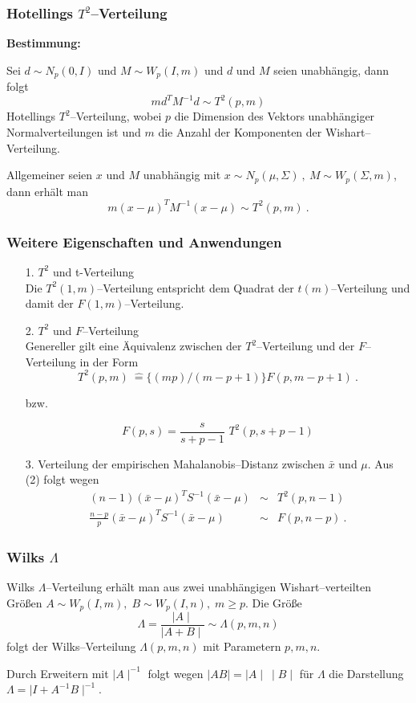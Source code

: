\begin{frame}\frametitle{Hotellings $T^2$--Verteilung}
{\bf Bestimmung:}

Sei $d \sim N_p(0,I)$ und $M \sim W_p(I,m)$ und $d$ und $M$ seien
unabh\"{a}ngig, dann folgt
\[
m d^T M^{-1}d \sim T^2(p,m)
\]
Hotellings $T^2$--Verteilung, wobei $p$ die Dimension des Vektors
unabh\"{a}ngiger Normalverteilungen ist und $m$ die Anzahl der
Komponenten der Wishart--Verteilung.

Allgemeiner seien $x$ und $M$ unabh\"{a}ngig mit $x \sim
N_p(\mu,\Sigma)\ ,\ M \sim W_p(\Sigma, m)$, dann erh\"{a}lt man
\[
m(x-\mu)^TM^{-1}(x - \mu) \sim T^2(p,m)\ .
\]
\end{frame}


\begin{frame}\frametitle{Weitere Eigenschaften und Anwendungen}
\footnotesize
\begin{enumerate}
\item [1.] $T^2$ und t-Verteilung\\
Die $T^2(1,m)$--Verteilung entspricht dem Quadrat der
$t(m)$--Verteilung und damit der $F(1,m)$--Verteilung.

\item [2.] $T^2$ und $F$--Verteilung\\
Genereller gilt eine \"{A}quivalenz zwischen der $T^2$--Verteilung
und der $F$--Verteilung in der Form
\[
T^2(p,m)\ {\hat=}\{(mp)/(m-p+1)\} F(p, m-p + 1)\ .
\]

bzw.

\[F(p,s)=\frac{s}{s+p-1}\,\,T^2(p,s+p-1)\]

\item [3.] Verteilung der empirischen Mahalanobis--Distanz zwischen $\bar{x}$
und $\mu$. Aus (2) folgt wegen
\begin{eqnarray*}%
  (n-1) (\bar{x} - \mu)^T S^{-1} (\bar{x}-\mu) & \sim & T^2(p,n-1) \\
  \frac{n-p}{p}(\bar{x}-\mu)^T S^{-1} (\bar{x} - \mu) & \sim & F(p, n-p)\ .
\end{eqnarray*}

\end{enumerate}
\end{frame}


\begin{frame}\frametitle{Wilks $\Lambda$}
Wilks $\Lambda$--Verteilung erh\"{a}lt man aus zwei unabh\"{a}ngigen
Wishart--verteilten Gr\"{o}{\ss}en $A\sim W_p(I, m),\;B\sim W_p(I,
n),\;m\ge p$. Die Gr\"{o}{\ss}e
\[
\Lambda=\frac{\mid A\mid}{\mid A + B\mid} \sim \Lambda(p, m, n)
\]
folgt der Wilks--Verteilung $\Lambda(p, m, n)$ mit Parametern $p, m,
n$.

Durch Erweitern mit  $\mid A\mid^{-1}$ folgt wegen $\mid A B\mid=
\mid A\mid\ \mid B\mid$ f\"{u}r $\Lambda$ die Darstellung
$\Lambda=\mid I + A^{-1}B\mid^{-1}$.\\
\end{frame}

